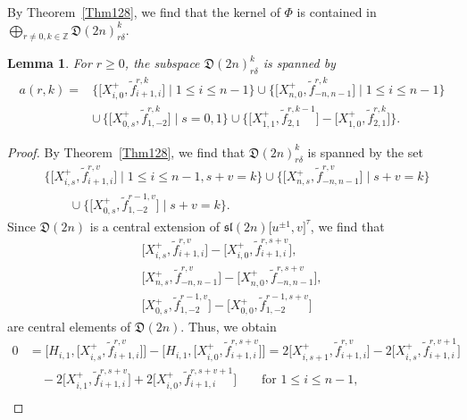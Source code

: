 \documentclass[pdftex]{sigma}
\numberwithin{equation}{section}
\newtheorem{Lemma}[Theorem]{Lemma}
\theoremstyle{definition}
\begin{document}
By Theorem~\ref{Thm128}, we find that the kernel of $\Phi$ is contained in $\bigoplus_{r\neq0,k\in\mathbb{Z}}\mathfrak{D}(2n)_{r\delta}^k$.
\begin{Lemma}
For $r\geq0$, the subspace $\mathfrak{D}(2n)_{r\delta}^k$ is spanned by
\begin{align*}
a(r,k)={}&\bigl\{\bigl[X^+_{i,0},\widetilde{f}_{i+1,i}^{r,k}\bigr]\mid1\leq i\leq n-1\bigr\}\cup\bigl\{\bigl[X^+_{n,0},\widetilde{f}_{-n,n-1}^{r,k}\bigr]\mid1\leq i\leq n-1\bigr\}\\
&{\cup}\,\bigl\{\bigl[X^+_{0,s},\widetilde{f}_{1,-2}^{r,k}\bigr]\mid s=0,1\bigr\}\cup\bigl\{\bigl[X^+_{1,1},\widetilde{f}_{2,1}^{r,k-1}\bigr]-\bigl[X^+_{1,0},\widetilde{f}_{2,1}^{r,k}\bigr]\bigr\}.
\end{align*}
\end{Lemma}
\begin{proof}
By Theorem~\ref{Thm128}, we find that $\mathfrak{D}(2n)_{r\delta}^k$ is spanned by the set
\begin{align*}
&\bigl\{\bigl[X^+_{i,s},\widetilde{f}_{i+1,i}^{r,v}\bigr]\mid1\leq i\leq n-1,s+v=k\bigr\}\cup\bigl\{\bigl[X^+_{n,s},\widetilde{f}_{-n,n-1}^{r,v}\bigr]\mid s+v=k\bigr\}\\
&\qquad{}\cup\bigl\{\bigl[X^+_{0,s},\widetilde{f}_{1,-2}^{r-1,v}\bigr]\mid s+v=k\bigr\}.
\end{align*}
Since $\mathfrak{D}(2n)$ is a central extension of $\mathfrak{sl}(2n)\bigl[u^{\pm1},v\bigr]^\tau$, we find that
\begin{gather*}
\bigl[X^+_{i,s},\widetilde{f}_{i+1,i}^{r,v}\bigr]-\bigl[X^+_{i,0},\widetilde{f}_{i+1,i}^{r,s+v}\bigr],\\
\bigl[X^+_{n,s},\widetilde{f}_{-n,n-1}^{r,v}\bigr]-\bigl[X^+_{n,0},\widetilde{f}_{-n,n-1}^{r,s+v}\bigr],\\
\bigl[X^+_{0,s},\widetilde{f}_{1,-2}^{r-1,v}\bigr]-\bigl[X^+_{0,0},\widetilde{f}_{1,-2}^{r-1,s+v}\bigr]
\end{gather*}
are central elements of $\mathfrak{D}(2n)$. Thus, we obtain
\begin{align}
0&=\bigl[H_{i,1},\bigl[X^+_{i,s},\widetilde{f}_{i+1,i}^{r,v}\bigr]\bigr]-\bigl[H_{i,1},\bigl[X^+_{i,0}, \widetilde{f}_{i+1,i}^{r,s+v}\bigr]\bigr]=2\bigl[X^+_{i,s+1},\widetilde{f}_{i+1,i}^{r,v}\bigr] -2\bigl[X^+_{i,s},\widetilde{f}_{i+1,i}^{r,v+1}\bigr]\nonumber\\
&\quad-2\bigl[X^+_{i,1},\widetilde{f}_{i+1,i}^{r,s+v}\bigr]+2\bigl[X^+_{i,0},\widetilde{f}_{i+1,i}^{r,s+v+1}\bigr]\qquad \text{for }1\leq i\leq n-1,\label{eq92}\\

\end{align}
\end{proof}
\end{document}
